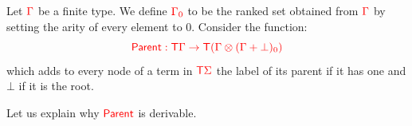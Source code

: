 \medskip
\noindent \begin{example}\label{ex:patternMatching} 
\end{example}


\medskip
\noindent \begin{example}\label{ex:sibling}  Let ${\color{red}{\Gamma}}$ be a finite type. We define ${\color{red}{{\color{red}{\Gamma}}_0}}$  to be the ranked set obtained from ${\color{red}{\Gamma}}$ by setting the arity of every element to $0$.  
\medskip
Consider the function:
$${\color{red}{ \mathsf{Parent}: {\color{red}{\mathsf T}}{\color{red}{\Gamma}}\to {\color{red}{\mathsf T}}({\color{red}{\Gamma}}\otimes ({\color{red}{\Gamma}}+\bot)_0)}}$$
which adds to every node of a term in ${\color{red}{\mathsf T}} {\color{red}{\Sigma}}$ the label  of its parent if it has one and $\bot$ if it is the root.

Let us explain why ${\color{red}{\mathsf{Parent}}}$ is derivable. 


\end{example}
